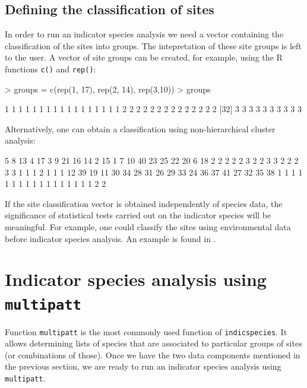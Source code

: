 \documentclass[11pt,a4paper]{article}
\begin{document}
\subsection{Defining the classification of sites}
In order to run an indicator species analysis we need a vector containing the classification of the sites into groups. The intepretation of these site groups is left to the user. A vector of site groups can be created, for example, using the R functions \texttt{c()} and \texttt{rep()}:
\begin{Schunk}
\begin{Sinput}
> groups = c(rep(1, 17), rep(2, 14), rep(3,10))
> groups
\end{Sinput}
\begin{Soutput}
 [1] 1 1 1 1 1 1 1 1 1 1 1 1 1 1 1 1 1 2 2 2 2 2 2 2 2 2 2 2 2 2 2
[32] 3 3 3 3 3 3 3 3 3 3
\end{Soutput}
\end{Schunk}
Alternatively, one can obtain a classification using non-hierarchical cluster analysis:
\begin{Schunk}
\begin{Soutput}
 5  8 13  4 17  3  9 21 16 14  2 15  1  7 10 40 23 25 22 20  6 18 
 2  2  2  2  2  3  2  2  3  3  2  2  2  3  3  1  1  1  2  1  1  1 
12 39 19 11 30 34 28 31 26 29 33 24 36 37 41 27 32 35 38 
 1  1  1  1  1  1  1  1  1  1  1  1  1  1  1  1  1  2  2 
\end{Soutput}
\end{Schunk}

If the site classification vector is obtained independently of species data, the significance of statistical tests carried out on the indicator species will be meaningful. For example, one could classify the sites using environmental data before indicator species analysis. An example is found in \citet{Borcard2011}.

\section{Indicator species analysis using \texttt{multipatt}}
Function \texttt{multipatt} is the most commonly used function of \texttt{indicspecies}. It allows determining lists of species that are associated to particular groups of sites (or combinations of those). Once we have the two data components mentioned in the previous section, we are ready to run an indicator species analysis using \texttt{multipatt}.
\end{document}
